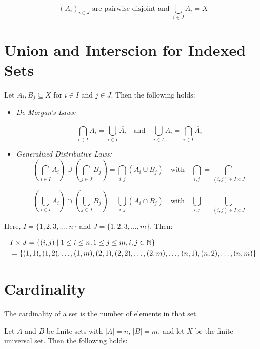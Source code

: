 \[
	{(A_i)}_{i \in J} \text{ are pairwise disjoint and } \bigcup_{i \in J} A_i = X
\]

\section{Union and Interscion for Indexed Sets}

Let \( A_i, B_j \subseteq X \) for \( i \in I \) and \( j \in J \). Then the following holds:

\begin{itemize}

	\item\emph{De Morgan's Laws:}

	      \[
		      \overline{\bigcap_{i \in I} A_i}= \bigcup_{i \in I} \overline{A_i} \quad \text{and} \quad
		      \overline{\bigcup_{i \in I} A_i} = \bigcap_{i \in I} \overline{A_i}
	      \]

	\item \emph{Generalized Distributive Laws:}
	      \[
		      \left(\bigcap_{i \in I} A_i \right)\cup \left(\bigcap_{j \in J} B_j \right)= \bigcap_{i,j} (A_i \cup B_j) \quad \text{with}
		      \quad \bigcap_{i,j} = \bigcap_{(i,j) \in I \times J}
	      \]

	      \[
		      \left(\bigcup_{i \in I} A_i \right) \cap \left(\bigcup_{j \in J} B_j \right) = \bigcup_{i,j} (A_i \cap B_j) \quad \text{with}
		      \quad \bigcup_{i,j} = \bigcup_{(i,j) \in I \times J}
	      \]

\end{itemize}

Here, \( I = \{ 1, 2, 3, \dots, n \} \) and \( J = \{ 1, 2, 3, \dots, m \} \). Then:

\begin{align*}
	 & I \times J = \{ (i, j) \mid 1 \leq i \leq n, 1 \leq j \leq m, i, j \in \mathbb{N} \}                               \\
	 & = \{ (1, 1), (1, 2), \dots, (1, m), (2, 1), (2, 2), \dots, (2, m), \dots, (n, 1), (n, 2), \dots, (n, m) \}
\end{align*}

\section{Cardinality}

The cardinality of a set is the number of elements in that set.

Let \(A\) and \(B\) be finite sets with \( |A| = n \), \( |B| = m \), and let \(X\) be the finite
universal set. Then the following holds:

